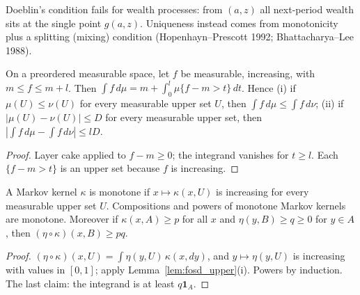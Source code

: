 Doeblin's condition fails for wealth processes: from $(a,z)$ all next-period wealth sits at the single point
$g(a,z)$. Uniqueness instead comes from monotonicity plus a splitting (mixing) condition
(Hopenhayn--Prescott 1992; Bhattacharya--Lee 1988).

\begin{lemma}
\label{lem:fosd_upper}
\leanok
On a preordered measurable space, let $f$ be measurable, increasing, with $m\le f\le m+l$. Then
$\int f\,d\mu = m + \int_0^l \mu\{f-m>t\}\,dt$. Hence (i) if $\mu(U)\le\nu(U)$ for every measurable upper set $U$,
then $\int f\,d\mu\le\int f\,d\nu$; (ii) if $|\mu(U)-\nu(U)|\le D$ for every measurable upper set, then
$|\int f\,d\mu-\int f\,d\nu|\le lD$.
\end{lemma}
\begin{proof}
\leanok
Layer cake applied to $f-m\ge0$; the integrand vanishes for $t\ge l$. Each $\{f-m>t\}$ is an upper set because $f$
is increasing.
\end{proof}

\begin{lemma}
\label{lem:monotone_kernel}
\leanok
{}
A Markov kernel $\kappa$ is monotone if $x\mapsto\kappa(x,U)$ is increasing for every measurable upper set $U$.
Compositions and powers of monotone Markov kernels are monotone. Moreover if $\kappa(x,A)\ge p$ for all $x$ and
$\eta(y,B)\ge q\ge0$ for $y\in A$, then $(\eta\circ\kappa)(x,B)\ge pq$.
\end{lemma}
\begin{proof}
\leanok
$(\eta\circ\kappa)(x,U) = \int\eta(y,U)\,\kappa(x,dy)$, and $y\mapsto\eta(y,U)$ is increasing with values in $[0,1]$;
apply Lemma~\ref{lem:fosd_upper}(i). Powers by induction. The last claim: the integrand is at least $q\mathbf 1_A$.
\end{proof}

